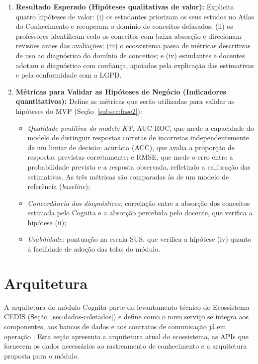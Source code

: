 \begin{enumerate}
    \item \textbf{Resultado Esperado (Hipóteses qualitativas de valor):} Explicita quatro hipóteses de valor: (i) os estudantes priorizam os seus estudos no Atlas do Conhecimento e recuperam o domínio de conceitos defasados; (ii) os professores identificam cedo os conceitos com baixa absorção e direcionam revisões antes das avaliações; (iii) o ecossistema passa de métricas descritivas de uso ao diagnóstico do domínio de conceitos; e (iv) estudantes e docentes adotam o diagnóstico com confiança, apoiados pela explicação das estimativas e pela conformidade com a LGPD.

    \item \textbf{Métricas para Validar as Hipóteses de Negócio (Indicadores quantitativos):} Define as métricas que serão utilizadas para validar as hipóteses do MVP (Seção~\ref{subsec:fase2}):
    \begin{itemize}
        \item \textit{Qualidade preditiva do modelo KT:} AUC-ROC, que mede a capacidade do modelo de distinguir respostas corretas de incorretas independentemente de um limiar de decisão; acurácia (ACC), que avalia a proporção de respostas previstas corretamente; e RMSE, que mede o erro entre a probabilidade prevista e a resposta observada, refletindo a calibração das estimativas. As três métricas são comparadas às de um modelo de referência (\textit{baseline});
        \item \textit{Concordância dos diagnósticos:} correlação entre a absorção dos conceitos estimada pelo Cognita e a absorção percebida pelo docente, que verifica a hipótese (ii);
        \item \textit{Usabilidade:} pontuação na escala SUS, que verifica a hipótese (iv) quanto à facilidade de adoção das telas do módulo.
    \end{itemize}
\end{enumerate}


\section{Arquitetura}
\label{sec:arquitetura}

A arquitetura do módulo Cognita parte do levantamento técnico do Ecossistema CEDIS (Seção~\ref{sec:dados-coletados}) e define como o novo serviço se integra aos componentes, aos bancos de dados e aos contratos de comunicação já em operação \cite{kleppmann_designing_2017, richards_fundamentals_2020}. Esta seção apresenta a arquitetura atual do ecossistema, as APIs que fornecem os dados necessários ao rastreamento de conhecimento e a arquitetura proposta para o módulo.

